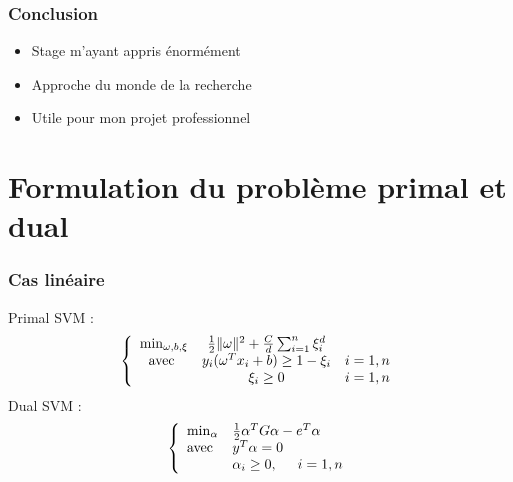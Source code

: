 \documentclass{beamer}
\begin{document}
\begin{frame}
	\frametitle{Conclusion}
	\begin{itemize}
		\item Stage m'ayant appris énormément
		\item Approche du monde de la recherche
		\item Utile pour mon projet professionnel
	\end{itemize}
\end{frame}

\appendix
\section{Formulation du problème primal et dual}
\begin{frame}
	\frametitle{Cas linéaire}
	Primal SVM :
	\[\left\{\begin{array}{c c c}
	\min_{\omega, b, \xi} & \frac{1}{2} \|\omega\|^2 +\frac{C}{d} \sum_{i=1}^n \xi_i^d &\\
	\text{avec } & y_i(\omega^Tx_i+b)\geq 1-\xi_i & i=1,n\\
		& \xi_i\geq 0 & i=1,n
	\end{array}\right.\]
	Dual SVM :
	\[\left\{\begin{array}{l l}
	\min_\alpha & \frac{1}{2} \alpha^TG\alpha -e^T\alpha\\
	\text{avec } & y^T\alpha=0\\
		& \alpha_i\geq 0, \hspace{0.5cm} i=1,n
	\end{array}\right.\]

\end{frame}
\end{document}
